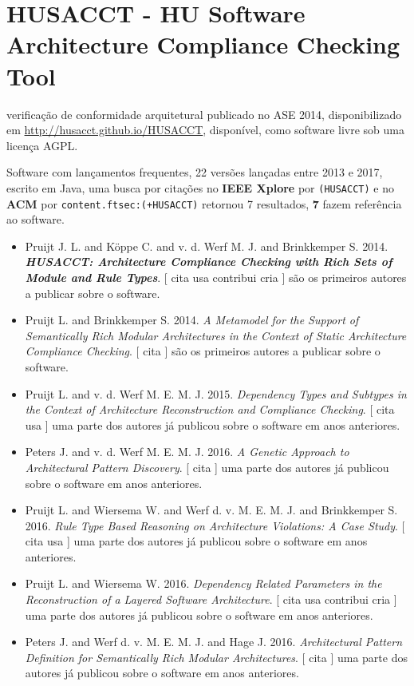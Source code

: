 \section{HUSACCT - HU Software Architecture Compliance Checking Tool}

verificação de conformidade arquitetural
publicado no ASE 2014,
disponibilizado em \url{http://husacct.github.io/HUSACCT},
disponível,
como software livre
sob uma licença AGPL.

Software com lançamentos frequentes,
22 versões lançadas
entre 2013 e 2017,
escrito em Java,
uma busca por citações no {\bf IEEE Xplore} por
\texttt{(HUSACCT)}
e no {\bf ACM} por
\texttt{content.ftsec:(+HUSACCT)}
retornou
7 resultados,
{\bf 7} fazem referência ao software.

\begin{itemize}
\item Pruijt J. L. and K\"{o}ppe C. and v. d. Werf M. J. and Brinkkemper S.
      2014.
        \textbf{\textit{ HUSACCT: Architecture Compliance Checking with Rich Sets of Module and Rule Types}}.
      [
          cita
          usa
          contribui
          cria
      ]
são os primeiros autores a publicar sobre o software.
\item Pruijt L. and Brinkkemper S.
      2014.
        \textit{ A Metamodel for the Support of Semantically Rich Modular Architectures in the Context of Static Architecture Compliance Checking}.
      [
          cita
      ]
são os primeiros autores a publicar sobre o software.
\item Pruijt L. and v. d. Werf M. E. M. J.
      2015.
        \textit{ Dependency Types and Subtypes in the Context of Architecture Reconstruction and Compliance Checking}.
      [
          cita
          usa
      ]
uma parte dos autores já publicou sobre o software em anos anteriores.
\item Peters J. and v. d. Werf M. E. M. J.
      2016.
        \textit{ A Genetic Approach to Architectural Pattern Discovery}.
      [
          cita
      ]
uma parte dos autores já publicou sobre o software em anos anteriores.
\item Pruijt L. and Wiersema W. and Werf d. v. M. E. M. J. and Brinkkemper S.
      2016.
        \textit{ Rule Type Based Reasoning on Architecture Violations: A Case Study}.
      [
          cita
          usa
      ]
uma parte dos autores já publicou sobre o software em anos anteriores.
\item Pruijt L. and Wiersema W.
      2016.
        \textit{ Dependency Related Parameters in the Reconstruction of a Layered Software Architecture}.
      [
          cita
          usa
          contribui
          cria
      ]
uma parte dos autores já publicou sobre o software em anos anteriores.
\item Peters J. and Werf d. v. M. E. M. J. and Hage J.
      2016.
        \textit{ Architectural Pattern Definition for Semantically Rich Modular Architectures}.
      [
          cita
      ]
uma parte dos autores já publicou sobre o software em anos anteriores.
\end{itemize}
